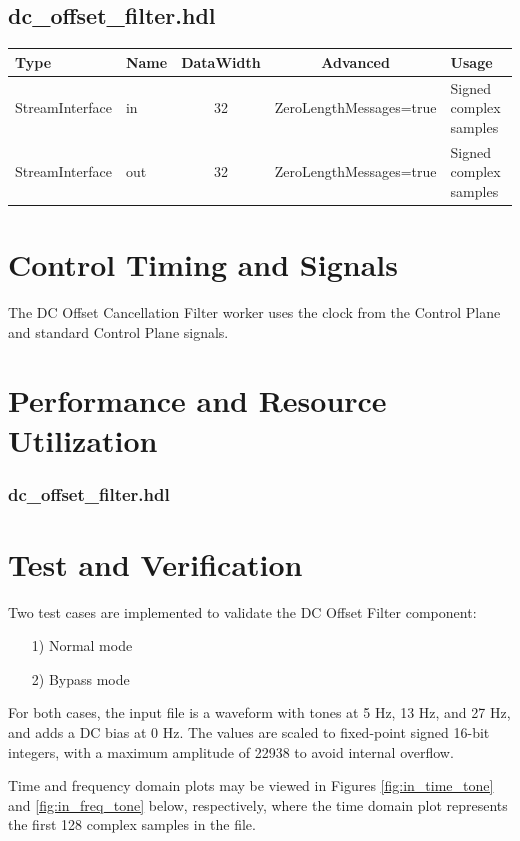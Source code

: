 \documentclass{article}
\def\comp{dc\_offset\_filter}
\edef\ecomp{dc_offset_filter}
\def\Comp{DC Offset Filter}
\begin{document}
\begin{landscape}
		\subsection*{\comp.hdl}
		\begin{scriptsize}
			\begin{tabular}{|M{2cm}|M{1.5cm}|c|c|M{12cm}|}
				\hline
				Type            & Name & DataWidth & Advanced                & Usage                  \\
				\hline
				StreamInterface & in   & 32        & ZeroLengthMessages=true & Signed complex samples \\
				\hline
				StreamInterface & out  & 32        & ZeroLengthMessages=true & Signed complex samples \\
				\hline
			\end{tabular}
		\end{scriptsize}
	\end{landscape}

	\section*{Control Timing and Signals}
	\begin{flushleft}
		The DC Offset Cancellation Filter worker uses the clock from the Control Plane and standard Control Plane signals.
	\end{flushleft}

	\section*{Performance and Resource Utilization}
	\subsubsection*{\comp.hdl}
	
	\section*{Test and Verification}
	\normalsize
	Two test cases are implemented to validate the \Comp{} component:
	\begin{itemize}
		\item[1)] Normal mode
		\item[2)] Bypass mode
	\end{itemize}
	\noindent For both cases, the input file is a waveform with tones at 5 Hz, 13 Hz, and 27 Hz, and adds a DC bias at 0 Hz. The values are scaled to fixed-point signed 16-bit integers, with a maximum amplitude of 22938 to avoid internal overflow.\par\medskip
	\noindent Time and frequency domain plots may be viewed in Figures \ref{fig:in_time_tone} and \ref{fig:in_freq_tone} below, respectively, where the time domain plot represents the first 128 complex samples in the file.
\end{document}
